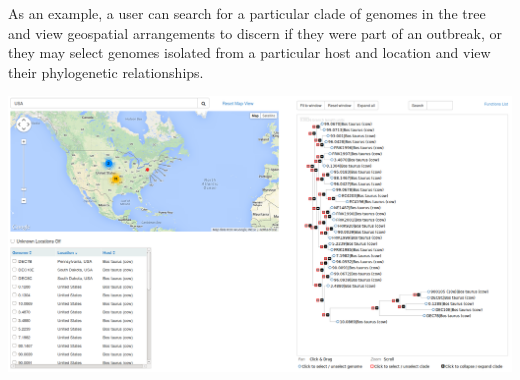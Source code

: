 \documentclass[12pt]{article}
\begin{document}
As an example, a user can search for a particular clade of genomes in the tree and view geospatial arrangements to discern if they were part of an outbreak, or they may select genomes isolated from a particular host and location and view their phylogenetic relationships.

\pagebreak

\begin{landscape}

\includegraphics[scale=0.33]{../manuscript_images/geophy.png}

\end{landscape}
\end{document}
